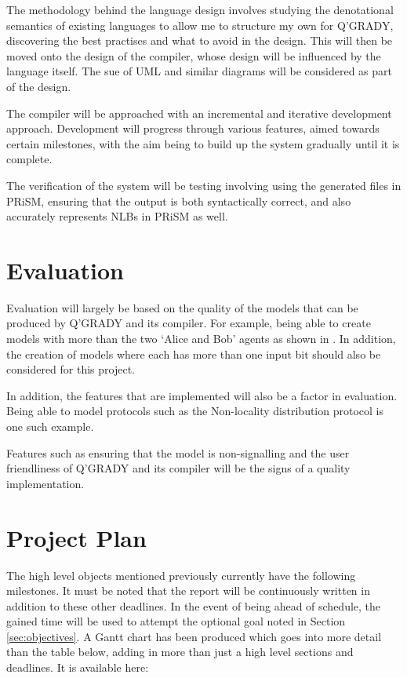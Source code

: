 \documentclass[11pt, a4paper]{article}
\begin{document}
The methodology behind the language design involves studying the denotational
semantics of existing languages to allow me to structure my own for Q'GRADY,
discovering the best practises and what to avoid in the design. This will then
be moved onto the design of the compiler, whose design will be influenced by the
language itself. The sue of UML and similar diagrams will be considered as part
of the design.

The compiler will be approached with an incremental and iterative development
approach. Development will progress through various features, aimed towards
certain milestones, with the aim being to build up the system gradually until it
is complete.

The verification of the system will be testing involving using the generated
files in PRiSM, ensuring that the output is both syntactically correct, and also
accurately represents NLBs in PRiSM as well.


\section{Evaluation} %
\label{sec:evaluation}
Evaluation will largely be based on the quality of the models that can be
produced by Q'GRADY and its compiler. For example, being able to create models
with more than the two `Alice and Bob' agents as shown in 
\parencite[Definition~1]{nlb_lamontagne}. In addition, the creation of models
where each has more than one input bit should also be considered for this
project.

In addition, the features that are implemented will also be a factor in
evaluation. Being able to model protocols such as the Non-locality distribution
protocol \parencite[Definition~16]{nlb_lamontagne} is one such example.

Features such as ensuring that the model is non-signalling and the user
friendliness of Q'GRADY and its compiler will be the signs of a quality
implementation.


\section{Project Plan} %
\label{sec:project_plan}
The high level objects mentioned previously currently have the following
milestones. It must be noted that the report will be continuously written in
addition to these other deadlines. In the event of being ahead of schedule, the
gained time will be used to attempt the optional goal noted in Section
\ref{sec:objectives}. A Gantt chart has been produced which goes into more
detail than the table below, adding in more than just a high level sections and
deadlines. It is available here:
\end{document}

